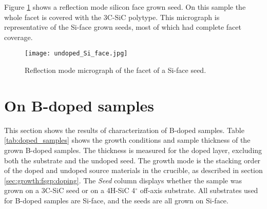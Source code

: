Figure \ref{fig:silicon_seed} shows a reflection mode silicon face grown seed. On this sample the whole facet is covered with the 3C-SiC polytype. This micrograph is representative of the Si-face grown seeds, most of which had complete facet coverage. 

\begin{figure}[H]
\begin{center}
\texttt{[image: undoped\_Si\_face.jpg]}
\caption{Reflection mode micrograph of the facet of a Si-face seed.
\label{fig:silicon_seed}}
\end{center}
\end{figure}




\section{On B-doped samples}
\label{sec:results:seeds}
This section shows the results of characterization of B-doped samples. Table \ref{tab:doped_samples} shows the growth conditions and sample thickness of the grown B-doped samples. The thickness is measured for the doped layer, excluding both the substrate and the undoped seed. The growth mode is the stacking order of the doped and undoped source materials in the crucible, as described in section \ref{sec:growth:fsgp:doping}. The \emph{Seed} column displays whether the sample was grown on a 3C-SiC seed or on a 4H-SiC 4$^\circ$ off-axis substrate. All substrates used for B-doped samples are Si-face, and the seeds are all grown on Si-face. 

